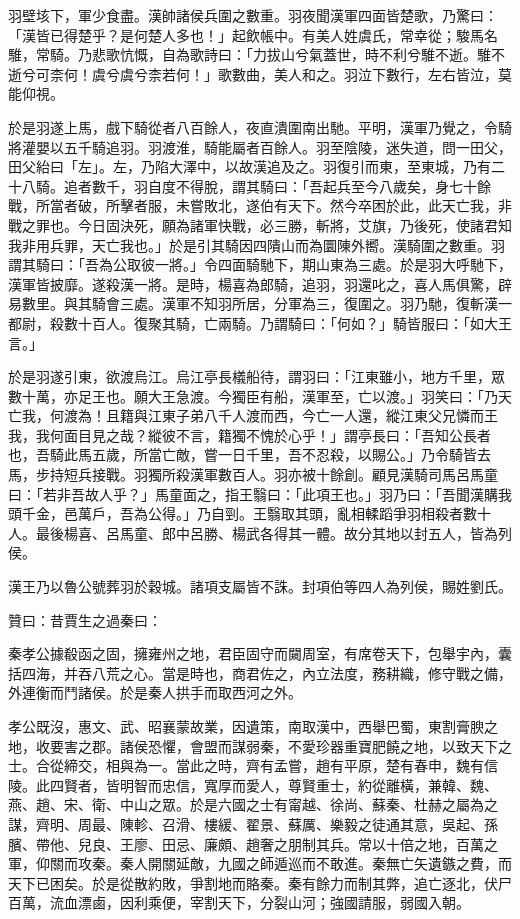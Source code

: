 \begin{pinyinscope}
羽壁垓下，軍少食盡。漢帥諸侯兵圍之數重。羽夜聞漢軍四面皆楚歌，乃驚曰：「漢皆已得楚乎？是何楚人多也！」起飲帳中。有美人姓虞氏，常幸從；駿馬名騅，常騎。乃悲歌忼慨，自為歌詩曰：「力拔山兮氣蓋世，時不利兮騅不逝。騅不逝兮可柰何！虞兮虞兮柰若何！」歌數曲，美人和之。羽泣下數行，左右皆泣，莫能仰視。

於是羽遂上馬，戲下騎從者八百餘人，夜直潰圍南出馳。平明，漢軍乃覺之，令騎將灌嬰以五千騎追羽。羽渡淮，騎能屬者百餘人。羽至陰陵，迷失道，問一田父，田父紿曰「左」。左，乃陷大澤中，以故漢追及之。羽復引而東，至東城，乃有二十八騎。追者數千，羽自度不得脫，謂其騎曰：「吾起兵至今八歲矣，身七十餘戰，所當者破，所擊者服，未嘗敗北，遂伯有天下。然今卒困於此，此天亡我，非戰之罪也。今日固決死，願為諸軍快戰，必三勝，斬將，艾旗，乃後死，使諸君知我非用兵罪，天亡我也。」於是引其騎因四隤山而為圜陳外嚮。漢騎圍之數重。羽謂其騎曰：「吾為公取彼一將。」令四面騎馳下，期山東為三處。於是羽大呼馳下，漢軍皆披靡。遂殺漢一將。是時，楊喜為郎騎，追羽，羽還叱之，喜人馬俱驚，辟易數里。與其騎會三處。漢軍不知羽所居，分軍為三，復圍之。羽乃馳，復斬漢一都尉，殺數十百人。復聚其騎，亡兩騎。乃謂騎曰：「何如？」騎皆服曰：「如大王言。」

於是羽遂引東，欲渡烏江。烏江亭長檥船待，謂羽曰：「江東雖小，地方千里，眾數十萬，亦足王也。願大王急渡。今獨臣有船，漢軍至，亡以渡。」羽笑曰：「乃天亡我，何渡為！且籍與江東子弟八千人渡而西，今亡一人還，縱江東父兄憐而王我，我何面目見之哉？縱彼不言，籍獨不愧於心乎！」謂亭長曰：「吾知公長者也，吾騎此馬五歲，所當亡敵，嘗一日千里，吾不忍殺，以賜公。」乃令騎皆去馬，步持短兵接戰。羽獨所殺漢軍數百人。羽亦被十餘創。顧見漢騎司馬呂馬童曰：「若非吾故人乎？」馬童面之，指王翳曰：「此項王也。」羽乃曰：「吾聞漢購我頭千金，邑萬戶，吾為公得。」乃自剄。王翳取其頭，亂相輮蹈爭羽相殺者數十人。最後楊喜、呂馬童、郎中呂勝、楊武各得其一體。故分其地以封五人，皆為列侯。

漢王乃以魯公號葬羽於穀城。諸項支屬皆不誅。封項伯等四人為列侯，賜姓劉氏。

贊曰：昔賈生之過秦曰：

秦孝公據殽函之固，擁雍州之地，君臣固守而闚周室，有席卷天下，包舉宇內，囊括四海，并吞八荒之心。當是時也，商君佐之，內立法度，務耕織，修守戰之備，外連衡而鬥諸侯。於是秦人拱手而取西河之外。

孝公既沒，惠文、武、昭襄蒙故業，因遺策，南取漢中，西舉巴蜀，東割膏腴之地，收要害之郡。諸侯恐懼，會盟而謀弱秦，不愛珍器重寶肥饒之地，以致天下之士。合從締交，相與為一。當此之時，齊有孟嘗，趙有平原，楚有春申，魏有信陵。此四賢者，皆明智而忠信，寬厚而愛人，尊賢重士，約從離橫，兼韓、魏、燕、趙、宋、衛、中山之眾。於是六國之士有甯越、徐尚、蘇秦、杜赫之屬為之謀，齊明、周最、陳軫、召滑、樓緩、翟景、蘇厲、樂毅之徒通其意，吳起、孫臏、帶他、兒良、王廖、田忌、廉頗、趙奢之朋制其兵。常以十倍之地，百萬之軍，仰關而攻秦。秦人開關延敵，九國之師遁巡而不敢進。秦無亡矢遺鏃之費，而天下已困矣。於是從散約敗，爭割地而賂秦。秦有餘力而制其弊，追亡逐北，伏尸百萬，流血漂鹵，因利乘便，宰割天下，分裂山河；強國請服，弱國入朝。


\end{pinyinscope}

